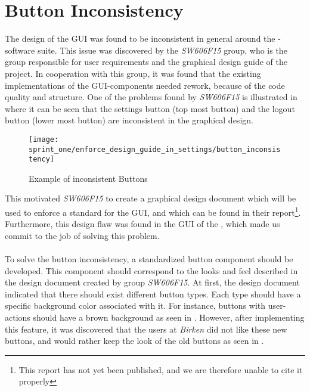 \section{Button Inconsistency}
\label{sub:button_inconsistency}

The design of the GUI was found to be inconsistent in general around the \giraf-software suite. This issue was discovered by the \emph{SW606F15} group, who is the group responsible for user requirements and the graphical design guide of the project. In cooperation with this group, it was found that the existing implementations of the GUI-components needed rework, because of the code quality and structure.  One of the problems found by \emph{SW606F15} is illustrated in  where it can be seen that the settings button (top most button) and the logout button (lower most button) are inconsistent in the graphical design.


\begin{figure}[!htbp]
    \centering
    \texttt{[image: sprint\_one/enforce\_design\_guide\_in\_settings/button\_inconsistency]}
    \caption{Example of inconsistent Buttons}
    \label{fig:button_inconsistency}
\end{figure}

This motivated \emph{SW606F15} to create a graphical design document which will be used to enforce a standard for the GUI, and which can be found in their report\footnote{This report has not yet been published, and we are therefore unable to cite it properly}. Furthermore, this design flaw was found in the GUI of the \launcher, which made us commit to the job of solving this problem.
\\\\
To solve the button inconsistency, a standardized button component should be developed. This component should correspond to the looks and feel described in the design document created by group \emph{SW606F15}. At first, the design document indicated that there should exist different button types. Each type should have a specific background color associated with it. For instance, buttons with user-actions should have a brown background as seen in . However, after implementing this feature, it was discovered that the users at \emph{Birken} did not like these new buttons, and would rather keep the look of the old buttons as seen in . 


